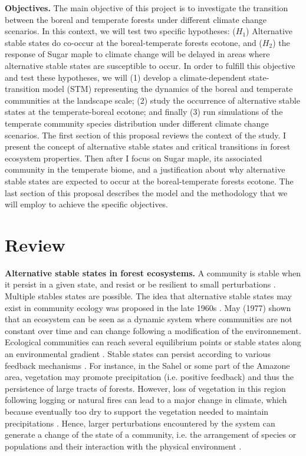 \textbf{Objectives.} The main objective of this project is to investigate the
transition between the boreal and temperate forests under different climate
change scenarios. In this context, we will test two specific hypotheses:
($H_1$) Alternative stable states do co-occur at the boreal-temperate forests
ecotone, and ($H_2$) the response of Sugar maple to climate change will be
delayed in areas where alternative stable states are susceptible to occur.
In order to fulfill this objective and test these hypotheses, we will (1)
develop a climate-dependent state-transition model (STM) representing the
dynamics of the boreal and temperate communities at the landscape scale; (2) study
the occurrence of alternative stable states at the temperate-boreal ecotone;
and finally (3) run simulations of the temperate community species
distribution under different climate change scenarios. The first section of
this proposal reviews the context of the study. I  
present the concept of alternative stable states and critical transitions in
forest ecosystem properties. Then after I focus on Sugar maple, its
associated community in the temperate biome, and a justification about why
alternative stable states are expected to occur at the boreal-temperate
forests ecotone. The last section of this proposal describes the model and the
methodology that we will employ to achieve the specific objectives.

\section{Review} 

\textbf{Alternative stable states in forest ecosystems.} A community is stable
when it persist in a given state, and resist or be resilient to small
perturbations \cite{Filbee-Dexter2013}. Multiple stables states are possible.
The idea that alternative stable states may exist in community ecology was
proposed in the late 1960s \cite{Scheffer2001,Society2014a}.  May (1977)
\cite{May1977} shown that an ecosystem can be seen as a dynamic system where
communities are not constant over time and can change following a modification
of the environnement. Ecological communities can reach several equilibrium
points or stable states along an environmental gradient \cite{May1977}.
Stable states can persist according to various feedback mechanisms
\cite{Filbee-Dexter2013}. For instance, in the Sahel or some part of the
Amazone area, vegetation may promote precipitation (i.e. positive feedback)
and thus the persistence of large tracts of forests. However, loss of
vegetation  in this region following logging or natural fires can lead to a
major change in climate, which because eventually too dry to support the
vegetation needed to maintain precipitations \cite{scheffer2009critical}.
Hence, larger perturbations encountered by the system can generate a change of
the state of a community, i.e. the arrangement of species or populations and
their interaction with the physical environment \cite {Filbee-Dexter2013}.\\

